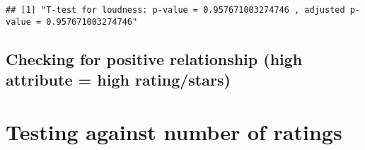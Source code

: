 \documentclass[
]{article}
\newenvironment{Shaded}{\begin{snugshade}}{\end{snugshade}}
\newcommand{\DecValTok}[1]{\textcolor[rgb]{0.00,0.00,0.81}{#1}}
\newcommand{\FunctionTok}[1]{\textcolor[rgb]{0.00,0.00,0.00}{#1}}
\newcommand{\NormalTok}[1]{#1}
\newcommand{\SpecialCharTok}[1]{\textcolor[rgb]{0.00,0.00,0.00}{#1}}
\newcommand{\StringTok}[1]{\textcolor[rgb]{0.31,0.60,0.02}{#1}}
\begin{document}
\begin{Shaded}
\end{Shaded}

\begin{verbatim}
## [1] "T-test for loudness: p-value = 0.957671003274746 , adjusted p-value = 0.957671003274746"
\end{verbatim}

\hypertarget{checking-for-positive-relationship-high-attribute-high-ratingstars}{%
\subsection{Checking for positive relationship (high attribute = high
rating/stars)}\label{checking-for-positive-relationship-high-attribute-high-ratingstars}}

\hypertarget{testing-against-number-of-ratings-2}{%
\section{Testing against number of
ratings}\label{testing-against-number-of-ratings-2}}
\end{document}
